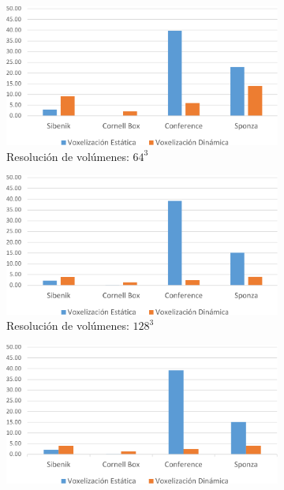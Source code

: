\begin{figure}[H]
	\centering
	\begin{subfigure}{.49\textwidth}
		\centering
		\includegraphics[width=\linewidth]{media/voxelzation_64_cropped.pdf}
		\caption*{Resolución de volúmenes: $64^3$}
	\end{subfigure}
	\begin{subfigure}{.49\textwidth}
		\centering
		\includegraphics[width=\linewidth]{media/voxelzation_128_cropped.pdf}	
		\caption*{Resolución de volúmenes: $128^3$}
	\end{subfigure}
	\par\bigskip
	\begin{subfigure}{.49\textwidth}
		\centering
		\includegraphics[width=\linewidth]{media/voxelzation_256_cropped.pdf}

\end{subfigure}
\end{figure}
